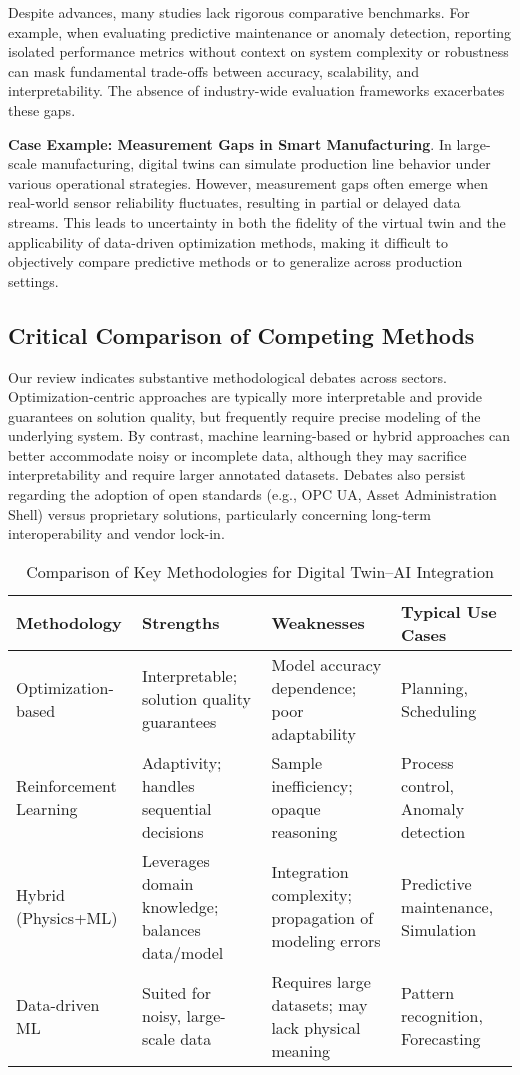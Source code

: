 \documentclass[sigconf]{acmart}
\begin{document}
Despite advances, many studies lack rigorous comparative benchmarks. For example, when evaluating predictive maintenance or anomaly detection, reporting isolated performance metrics without context on system complexity or robustness can mask fundamental trade-offs between accuracy, scalability, and interpretability. The absence of industry-wide evaluation frameworks exacerbates these gaps. 

\textbf{Case Example: Measurement Gaps in Smart Manufacturing}. In large-scale manufacturing, digital twins can simulate production line behavior under various operational strategies. However, measurement gaps often emerge when real-world sensor reliability fluctuates, resulting in partial or delayed data streams. This leads to uncertainty in both the fidelity of the virtual twin and the applicability of data-driven optimization methods, making it difficult to objectively compare predictive methods or to generalize across production settings.

\subsection{Critical Comparison of Competing Methods}

Our review indicates substantive methodological debates across sectors. Optimization-centric approaches are typically more interpretable and provide guarantees on solution quality, but frequently require precise modeling of the underlying system. By contrast, machine learning-based or hybrid approaches can better accommodate noisy or incomplete data, although they may sacrifice interpretability and require larger annotated datasets. Debates also persist regarding the adoption of open standards (e.g., OPC UA, Asset Administration Shell) versus proprietary solutions, particularly concerning long-term interoperability and vendor lock-in.

\begin{table*}[htbp]
\centering
\caption{Comparison of Key Methodologies for Digital Twin–AI Integration}
\label{tab:method_comparison}
\begin{adjustbox}{max width=\textwidth}
\begin{tabular}{@{}llll@{}}
\toprule
Methodology & Strengths & Weaknesses & Typical Use Cases\\
\midrule
Optimization-based & Interpretable; solution quality guarantees & Model accuracy dependence; poor adaptability & Planning, Scheduling\\
Reinforcement Learning & Adaptivity; handles sequential decisions & Sample inefficiency; opaque reasoning & Process control, Anomaly detection\\
Hybrid (Physics+ML) & Leverages domain knowledge; balances data/model & Integration complexity; propagation of modeling errors & Predictive maintenance, Simulation\\
Data-driven ML & Suited for noisy, large-scale data & Requires large datasets; may lack physical meaning & Pattern recognition, Forecasting\\
\bottomrule
\end{tabular}
\end{adjustbox}
\end{table*}
\end{document}
